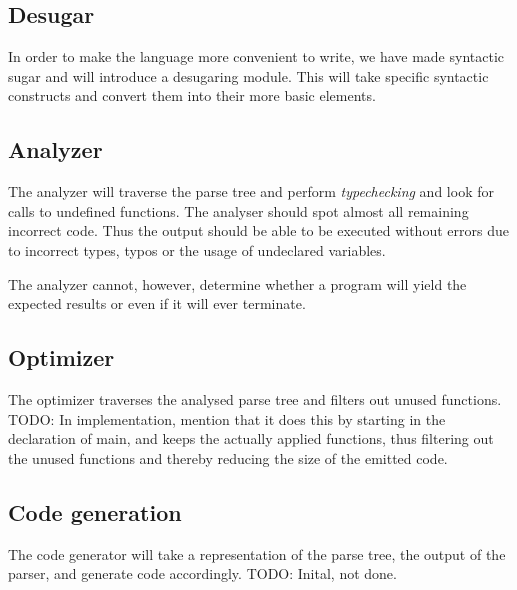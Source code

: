 \subsection{Desugar}
In order to make the language more convenient to write, we have made syntactic sugar and will introduce a desugaring module. This will take specific syntactic constructs and convert them into their more basic elements.

\subsection{Analyzer}
The analyzer will traverse the parse tree and perform \emph{typechecking} and look for calls to undefined functions. The analyser should spot almost all remaining incorrect code. Thus the output should be able to be executed without errors due to incorrect types, typos or the usage of undeclared variables.

The analyzer cannot, however, determine whether a program will yield the expected results or even if it will ever terminate.


\subsection{Optimizer}
The optimizer traverses the analysed parse tree and filters out unused functions. 
TODO: In implementation, mention that it does this by starting in the declaration of main, and keeps the actually applied functions, thus filtering out the unused functions and thereby reducing the size of the emitted code. 


\subsection{Code generation}
The code generator will take a representation of the
parse tree, the output of the parser, and generate code
accordingly. TODO: Inital, not done.

